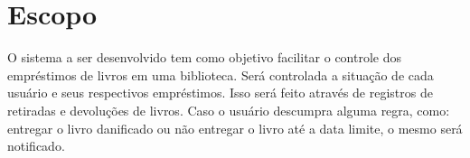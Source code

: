 \chapter{Escopo}

O sistema a ser desenvolvido tem como objetivo facilitar o controle dos empréstimos de livros em uma biblioteca. Será controlada a situação de cada usuário e seus respectivos empréstimos. Isso será feito através de registros de retiradas e devoluções de livros. Caso o usuário descumpra alguma regra, como: entregar o livro danificado ou não entregar o livro até a data limite, o mesmo será notificado.
